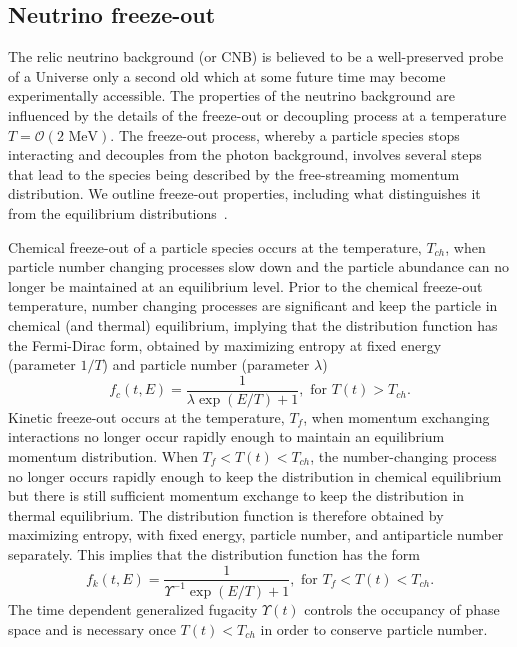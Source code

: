 \documentclass[universe,article,submit,moreauthors,pdftex,a4paper]{Definitions/mdpi}
\newcommand{\MeV}{\text{ MeV}}
\newcommand*{\xblue}{\color{black}}
\begin{document}
\subsection{Neutrino freeze-out}\label{sec:Freezeout}
\noindent The relic neutrino background (or CNB) is believed to be a well-preserved probe of a Universe only a second old which at some future time may become experimentally accessible. The properties of the neutrino background are influenced by the details of the freeze-out or decoupling process at a temperature $T=\mathcal{O}(2\MeV)$. The freeze-out process, whereby a particle species stops interacting and decouples from the photon background, involves several steps that lead to the species being described by the free-streaming momentum distribution. We outline freeze-out properties, including what distinguishes it from the equilibrium distributions~\cite{Birrell:2012gg}.

Chemical freeze-out of a particle species occurs at the temperature, $T_{ch}$, when particle number changing processes slow down and the particle abundance can no longer be maintained at an equilibrium level. Prior to the chemical freeze-out temperature, number changing processes are significant and keep the particle in chemical (and thermal) equilibrium, implying that the distribution function has the Fermi-Dirac form, obtained by maximizing entropy at fixed energy {\xblue (parameter $1/T$) and  particle number (parameter $\lambda$)}
\begin{equation}\label{equilibrium}
f_{c}(t,E)=\frac{1}{\lambda\exp(E/T)+1}, \text{ for } T(t)> T_{ch}.
\end{equation}
Kinetic freeze-out occurs at the temperature, $T_f$, when momentum exchanging interactions no longer occur rapidly enough to maintain an equilibrium momentum distribution. When $T_f<T(t)<T_{ch}$, the number-changing process no longer occurs rapidly enough to keep the distribution in chemical equilibrium but there is still sufficient momentum exchange to keep the distribution in thermal equilibrium. The distribution function is therefore obtained by maximizing entropy, with fixed energy, particle number, and antiparticle number separately. This implies that the distribution function has the form
\begin{equation}\label{kinetic_equilib}
f_k(t,E)=\frac{1}{\Upsilon^{-1}\exp(E/T)+1}, \text{ for }T_f< T(t)< T_{ch}.
\end{equation}
{\xblue The time dependent generalized} fugacity $\Upsilon(t)$ controls the occupancy of phase space and is necessary once $T(t)<T_{ch}$ in order to conserve particle number.
 
\end{document}
